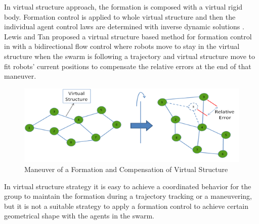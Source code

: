 In virtual structure approach, the formation is composed with a virtual rigid body. Formation control is applied to whole virtual structure and then the individual agent control laws are determined with inverse dynamic solutions \cite{12}.  Lewis and Tan proposed a virtual structure based method for formation control in \cite{23} with a bidirectional flow control where robots move to stay in the virtual structure when the swarm is following a trajectory and virtual structure move to fit robots' current positions to compensate the relative errors at the end of that maneuver. 

\begin{figure}[H]
	\caption{Maneuver of a Formation and Compensation of Virtual Structure}
	\centering
	\includegraphics[scale = 1]{virtual_structure}
\end{figure}

In virtual structure strategy it is easy to achieve a coordinated behavior for the group to maintain the formation during a trajectory tracking or a maneuvering, but it is not a suitable strategy to apply a formation control to achieve certain geometrical shape with the agents in the swarm. 


